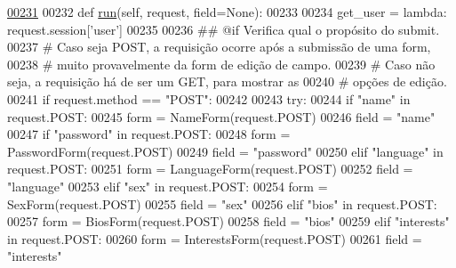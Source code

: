 \begin{DoxyCode}
\hypertarget{classProfile_1_1ProfileUnit_1_1UiFullProfile_l00231}{}\hyperlink{classProfile_1_1ProfileUnit_1_1UiFullProfile_a7a7747246b627020a345f7a3eac27778}{00231} 
00232     \textcolor{keyword}{def }\hyperlink{classProfile_1_1ProfileUnit_1_1UiFullProfile_a7a7747246b627020a345f7a3eac27778}{run}(self, request, field=None):
00233 
00234         get\_user = \textcolor{keyword}{lambda}: request.session[\textcolor{stringliteral}{'user'}]
00235 
00236         \textcolor{comment}{## @if Verifica qual o propósito do submit.}
00237         \textcolor{comment}{#   Caso seja POST, a requisição ocorre após a submissão de uma form,}
00238         \textcolor{comment}{#       muito provavelmente da form de edição de campo.}
00239         \textcolor{comment}{#   Caso não seja, a requisição há de ser um GET, para mostrar as}
00240         \textcolor{comment}{#       opções de edição.}
00241         \textcolor{keywordflow}{if} request.method == \textcolor{stringliteral}{"POST"}:
00242 
00243             \textcolor{keywordflow}{try}:
00244                 \textcolor{keywordflow}{if}   \textcolor{stringliteral}{"name"} \textcolor{keywordflow}{in} request.POST:
00245                     form = NameForm(request.POST)
00246                     field = \textcolor{stringliteral}{"name"}
00247                 \textcolor{keywordflow}{if}  \textcolor{stringliteral}{"password"} \textcolor{keywordflow}{in} request.POST:
00248                     form = PasswordForm(request.POST)
00249                     field = \textcolor{stringliteral}{"password"}
00250                 \textcolor{keywordflow}{elif} \textcolor{stringliteral}{"language"} \textcolor{keywordflow}{in} request.POST:
00251                     form = LanguageForm(request.POST)
00252                     field = \textcolor{stringliteral}{"language"}
00253                 \textcolor{keywordflow}{elif} \textcolor{stringliteral}{"sex"} \textcolor{keywordflow}{in} request.POST:
00254                     form = SexForm(request.POST)
00255                     field = \textcolor{stringliteral}{"sex"}
00256                 \textcolor{keywordflow}{elif} \textcolor{stringliteral}{"bios"} \textcolor{keywordflow}{in} request.POST:
00257                     form = BiosForm(request.POST)
00258                     field = \textcolor{stringliteral}{"bios"}
00259                 \textcolor{keywordflow}{elif} \textcolor{stringliteral}{"interests"} \textcolor{keywordflow}{in} request.POST:
00260                     form = InterestsForm(request.POST)
00261                     field = \textcolor{stringliteral}{"interests"}

\end{DoxyCode}
